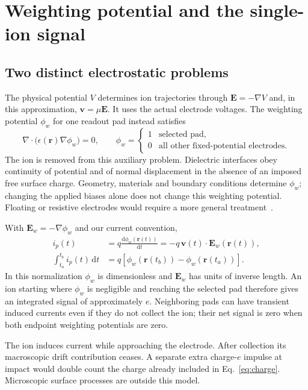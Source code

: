 \documentclass[11pt,a4paper]{article}
\newcommand{\dd}{\mathrm{d}}
\begin{document}
\clearpage
\section{Weighting potential and the single-ion signal}
\subsection{Two distinct electrostatic problems}
The physical potential $V$ determines ion trajectories through
$\mathbf E=-\nabla V$ and, in this approximation, $\mathbf v=\mu\mathbf E$.
It uses the actual electrode voltages. The weighting potential $\phi_w$ for one
readout pad instead satisfies
\begin{equation}
 \nabla\!\cdot\!\bigl(\epsilon(\mathbf r)\nabla\phi_w\bigr)=0,
 \qquad
 \phi_w=\begin{cases}1&\text{selected pad},\\0&\text{all other fixed-potential electrodes}.
 \end{cases}
 \label{eq:weighting}
\end{equation}
The ion is removed from this auxiliary problem. Dielectric interfaces obey
continuity of potential and of normal displacement in the absence of an imposed
free surface charge. Geometry, materials and boundary conditions determine
$\phi_w$; changing the applied biases alone does not change this weighting
potential. Floating or resistive electrodes would require a more general
treatment~\cite{riegler2016,riegler2019}.

With $\mathbf E_w=-\nabla\phi_w$ and our current convention,
\begin{align}
 i_p(t)&=q\frac{\dd\phi_w(\mathbf r(t))}{\dd t}
       =-q\,\mathbf v(t)\cdot\mathbf E_w(\mathbf r(t)),\label{eq:ramo}\\
 \int_{t_a}^{t_b}i_p(t)\,\dd t
       &=q\left[\phi_w(\mathbf r(t_b))-\phi_w(\mathbf r(t_a))\right].
       \label{eq:charge}
\end{align}
In this normalization $\phi_w$ is dimensionless and $\mathbf E_w$ has units
of inverse length. An ion starting where $\phi_w$ is negligible and reaching
the selected pad therefore gives an integrated signal of approximately $e$.
Neighboring pads can have transient induced currents even if they do not
collect the ion; their net signal is zero when both endpoint weighting
potentials are zero.

The ion induces current while approaching the electrode. After collection
its macroscopic drift contribution ceases. A separate extra charge-$e$ impulse
at impact would double count the charge already included in
Eq.~\eqref{eq:charge}. Microscopic surface processes are outside this model.
\end{document}

